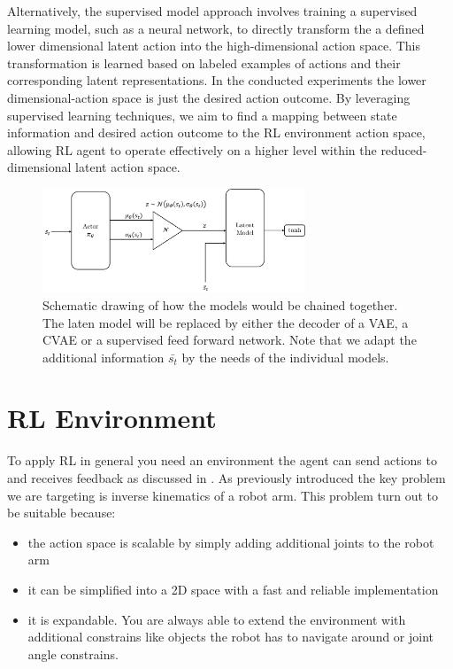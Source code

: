 Alternatively, the supervised model approach involves training a supervised learning model, such as a neural network, to directly transform the a defined lower dimensional latent action into the high-dimensional action space. This transformation is learned based on labeled examples of actions and their corresponding latent representations. In the conducted experiments the lower dimensional-action space is just the desired action outcome. By leveraging supervised learning techniques, we aim to find a mapping between state information and desired action outcome to the RL environment action space, allowing RL agent to operate effectively on a higher level within the reduced-dimensional latent action space.
\begin{figure}
	\centering
	\includegraphics[width=0.7\textwidth,]{figures/methodology/SAC+LatentModel.png}
	\caption[Research idea]{Schematic drawing of how the models would be chained together. The laten model will be replaced by either the decoder of a VAE, a CVAE or a supervised feed forward network. Note that we adapt the additional information $\bar{s_t}$ by the needs of the individual models. }
	\label{fig:research_idea}
\end{figure}


\section{RL Environment}\label{sec:RL-Environment}

To apply RL in general you need an environment the agent can send actions to and receives feedback as discussed in . As previously introduced the key problem we are targeting is inverse kinematics of a robot arm. This problem turn out to be suitable because:
\begin{itemize}
    \item the action space is scalable by simply adding additional joints to the robot arm
    \item it can be simplified into a 2D space with a fast and reliable implementation
    \item it is expandable. You are always able to extend the environment with additional constrains like objects the robot has to navigate around or joint angle constrains.
\end{itemize}

